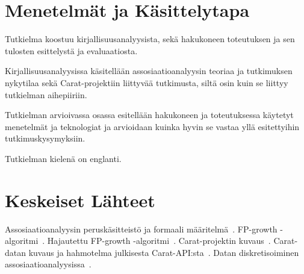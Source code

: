 \documentclass[finnish]{tktltiki2}
\theoremstyle{definition}
\theoremstyle{remark}
\begin{document}
\section*{Menetelmät ja Käsittelytapa}

Tutkielma koostuu kirjallisuusanalyysista, sekä hakukoneen toteutuksen ja sen tulosten esittelystä ja evaluaatiosta.

Kirjallisuusanalyysissa käsitellään assosiaatioanalyysin teoriaa ja tutkimuksen nykytilaa sekä Carat-projektiin liittyvää tutkimusta, siltä osin kuin se liittyy tutkielman aihepiiriin.

Tutkielman arvioivassa osassa esitellään hakukoneen ja toteutuksessa käytetyt menetelmät ja teknologiat ja arvioidaan kuinka hyvin se vastaa yllä esitettyihin tutkimuskysymyksiin.

Tutkielman kielenä on englanti.    

\section*{Keskeiset Lähteet}

Assosiaatioanalyysin peruskäsitteistö ja formaali määritelmä~\cite{Agrawal:1993:MAR:170036.170072}. FP-growth -algoritmi~\cite{Han:2000:MFP:335191.335372}. Hajautettu FP-growth -algoritmi~\cite{Li:2008:PPF:1454008.1454027}. Carat-projektin kuvaus~\cite{Oliner:2013:CCE:2517351.2517354}. Carat-datan kuvaus ja hahmotelma julkisesta Carat-API:sta~\cite{7840871}. Datan diskretisoiminen assosiaatioanalyysissa~\cite{Webb:2001:DAN:502512.502569,Lud2000}.


%
%
% 
%







% 
\end{document}
